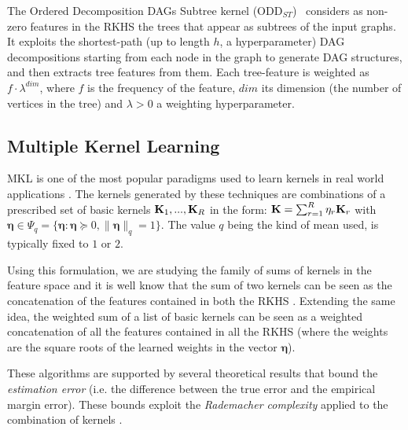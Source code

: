 \documentclass{esannV2}
\newcommand{\KK}{{\bf K}}
\newcommand{\1}{{\bf 1}}
\newcommand{\eeta}{\pmb{\eta}}
\begin{document}
The Ordered Decomposition DAGs Subtree kernel (ODD$_{ST}$)~\cite{DaSanMartino2016} considers as non-zero features in the RKHS the trees that appear as subtrees of the input graphs.
It exploits the shortest-path (up to length $h$, a hyperparameter) DAG decompositions starting from each node in the graph to generate DAG structures, and then extracts tree features from them.
Each tree-feature is weighted as $f \cdot \lambda^{dim}$, where $f$ is the frequency of the feature, $dim$ its dimension (the number of vertices in the tree) and $\lambda>0$ a weighting hyperparameter.

\subsection{Multiple Kernel Learning}
\label{MKL}
MKL \cite{Gonen2011} is one of the most popular paradigms used to learn kernels in real world applications \cite{Bucak2014}. %
The kernels generated by these techniques are combinations of a prescribed set of basic kernels $\KK_1,...,\KK_R$ in the form:
$ \KK = \sum_{r=1}^R \eta_r \KK_r$ with $\eeta \in \Psi_q = \{ \eeta : \eeta \succcurlyeq 0, \| \eeta \|_q = 1 \}$. The value $q$ being the kind of mean used, is typically fixed to $1$ or $2$.

Using this formulation, we are studying the family of sums of kernels in the feature space and it is well know that the sum of two kernels can be seen as the concatenation of the features contained in both the RKHS \cite{Shawe-Taylor2004}. Extending the same idea, the weighted sum of a list of basic kernels can be seen as a weighted concatenation of all the features contained in all the RKHS (where the weights are the square roots of the learned weights in the vector $\eeta$).


These algorithms are supported by several theoretical results that bound the \emph{estimation error} (i.e. the difference between the true error and the empirical margin error). These bounds exploit the \emph{Rademacher complexity} applied to the combination of kernels \cite{Maurer2012,Cortes2009c}.%
\end{document}
